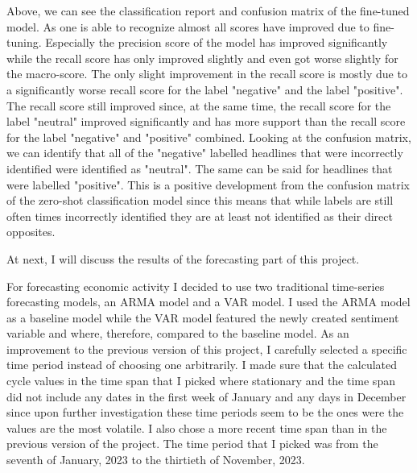 \documentclass[11pt, a4paper, leqno]{article}
\begin{document}






Above, we can see the classification report and confusion matrix of the fine-tuned model. As one is able to recognize almost all scores have improved due to fine-tuning. Especially the precision score of the model has improved significantly while the recall score has only improved slightly and even got worse slightly for the macro-score. The only slight improvement in the recall score is mostly due to a significantly worse recall score for the label "negative" and the label "positive". The recall score still improved since, at the same time, the recall score for the label "neutral" improved significantly and has more support than the recall score for the label "negative" and "positive" combined.
Looking at the confusion matrix, we can identify that all of the "negative" labelled headlines that were incorrectly identified were identified as "neutral". The same can be said for headlines that were labelled "positive". This is a positive development from the confusion matrix of the zero-shot classification model since this means that while labels are still often times incorrectly identified they are at least not identified as their direct opposites.

At next, I will discuss the results of the forecasting part of this project.

For forecasting economic activity I decided to use two traditional time-series forecasting models, an ARMA model and a VAR model. I used the ARMA model as a baseline model while the VAR model featured the newly created sentiment variable and where, therefore, compared to the baseline model. As an improvement to the previous version of this project, I carefully selected a specific time period instead of choosing one arbitrarily. I made sure that the calculated cycle values in the time span that I picked where stationary and the time span did not include any dates in the first week of January and any days in December since upon further investigation these time periods seem to be the ones were the values are the most volatile. I also chose a more recent time span than in the previous version of the project. The time period that I picked was from the seventh of January, 2023 to the thirtieth of November, 2023.


\end{document}
